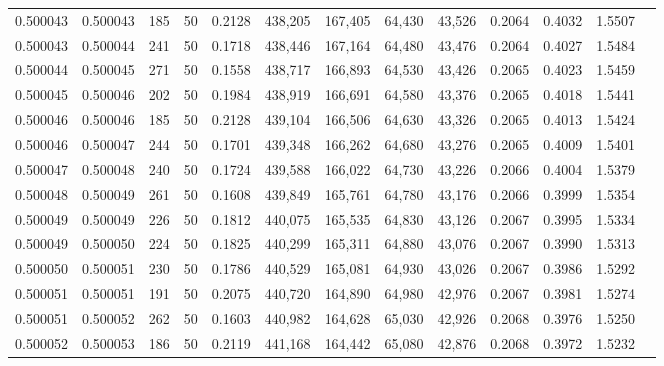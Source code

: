 \begin{tabular}{rrrrrrrrrrrrr}
0.500043 & 0.500043 & 185 &  50 &                                     0.2128 & 438,205 & 167,405 &  64,430 &  43,526 & 0.2064 & 0.4032 & 1.5507 \\
0.500043 & 0.500044 & 241 &  50 &                                     0.1718 & 438,446 & 167,164 &  64,480 &  43,476 & 0.2064 & 0.4027 & 1.5484 \\
0.500044 & 0.500045 & 271 &  50 &                                     0.1558 & 438,717 & 166,893 &  64,530 &  43,426 & 0.2065 & 0.4023 & 1.5459 \\
0.500045 & 0.500046 & 202 &  50 &                                     0.1984 & 438,919 & 166,691 &  64,580 &  43,376 & 0.2065 & 0.4018 & 1.5441 \\
0.500046 & 0.500046 & 185 &  50 &                                     0.2128 & 439,104 & 166,506 &  64,630 &  43,326 & 0.2065 & 0.4013 & 1.5424 \\
0.500046 & 0.500047 & 244 &  50 &                                     0.1701 & 439,348 & 166,262 &  64,680 &  43,276 & 0.2065 & 0.4009 & 1.5401 \\
0.500047 & 0.500048 & 240 &  50 &                                     0.1724 & 439,588 & 166,022 &  64,730 &  43,226 & 0.2066 & 0.4004 & 1.5379 \\
0.500048 & 0.500049 & 261 &  50 &                                     0.1608 & 439,849 & 165,761 &  64,780 &  43,176 & 0.2066 & 0.3999 & 1.5354 \\
0.500049 & 0.500049 & 226 &  50 &                                     0.1812 & 440,075 & 165,535 &  64,830 &  43,126 & 0.2067 & 0.3995 & 1.5334 \\
0.500049 & 0.500050 & 224 &  50 &                                     0.1825 & 440,299 & 165,311 &  64,880 &  43,076 & 0.2067 & 0.3990 & 1.5313 \\
0.500050 & 0.500051 & 230 &  50 &                                     0.1786 & 440,529 & 165,081 &  64,930 &  43,026 & 0.2067 & 0.3986 & 1.5292 \\
0.500051 & 0.500051 & 191 &  50 &                                     0.2075 & 440,720 & 164,890 &  64,980 &  42,976 & 0.2067 & 0.3981 & 1.5274 \\
0.500051 & 0.500052 & 262 &  50 &                                     0.1603 & 440,982 & 164,628 &  65,030 &  42,926 & 0.2068 & 0.3976 & 1.5250 \\
0.500052 & 0.500053 & 186 &  50 &                                     0.2119 & 441,168 & 164,442 &  65,080 &  42,876 & 0.2068 & 0.3972 & 1.5232 \\

\end{tabular}
